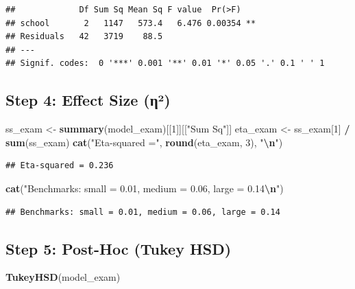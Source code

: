 \documentclass[
]{article}
\newenvironment{Shaded}{\begin{snugshade}}{\end{snugshade}}
\newcommand{\DecValTok}[1]{\textcolor[rgb]{0.00,0.00,0.81}{#1}}
\newcommand{\FunctionTok}[1]{\textcolor[rgb]{0.13,0.29,0.53}{\textbf{#1}}}
\newcommand{\NormalTok}[1]{#1}
\newcommand{\OtherTok}[1]{\textcolor[rgb]{0.56,0.35,0.01}{#1}}
\newcommand{\SpecialCharTok}[1]{\textcolor[rgb]{0.81,0.36,0.00}{\textbf{#1}}}
\newcommand{\StringTok}[1]{\textcolor[rgb]{0.31,0.60,0.02}{#1}}
\begin{document}
\begin{verbatim}
##             Df Sum Sq Mean Sq F value  Pr(>F)   
## school       2   1147   573.4   6.476 0.00354 **
## Residuals   42   3719    88.5                   
## ---
## Signif. codes:  0 '***' 0.001 '**' 0.01 '*' 0.05 '.' 0.1 ' ' 1
\end{verbatim}

\subsection{Step 4: Effect Size
(η²)}\label{step-4-effect-size-ux3b7uxb2-1}

\begin{Shaded}
\begin{Highlighting}[]
\NormalTok{ss\_exam  }\OtherTok{\textless{}{-}} \FunctionTok{summary}\NormalTok{(model\_exam)[[}\DecValTok{1}\NormalTok{]][[}\StringTok{"Sum Sq"}\NormalTok{]]}
\NormalTok{eta\_exam }\OtherTok{\textless{}{-}}\NormalTok{ ss\_exam[}\DecValTok{1}\NormalTok{] }\SpecialCharTok{/} \FunctionTok{sum}\NormalTok{(ss\_exam)}
\FunctionTok{cat}\NormalTok{(}\StringTok{"Eta{-}squared ="}\NormalTok{, }\FunctionTok{round}\NormalTok{(eta\_exam, }\DecValTok{3}\NormalTok{), }\StringTok{"}\SpecialCharTok{\textbackslash{}n}\StringTok{"}\NormalTok{)}
\end{Highlighting}
\end{Shaded}

\begin{verbatim}
## Eta-squared = 0.236
\end{verbatim}

\begin{Shaded}
\begin{Highlighting}[]
\FunctionTok{cat}\NormalTok{(}\StringTok{"Benchmarks: small = 0.01, medium = 0.06, large = 0.14}\SpecialCharTok{\textbackslash{}n}\StringTok{"}\NormalTok{)}
\end{Highlighting}
\end{Shaded}

\begin{verbatim}
## Benchmarks: small = 0.01, medium = 0.06, large = 0.14
\end{verbatim}

\subsection{Step 5: Post-Hoc (Tukey
HSD)}\label{step-5-post-hoc-tukey-hsd-1}

\begin{Shaded}
\begin{Highlighting}[]
\FunctionTok{TukeyHSD}\NormalTok{(model\_exam)}
\end{Highlighting}
\end{Shaded}
\end{document}
